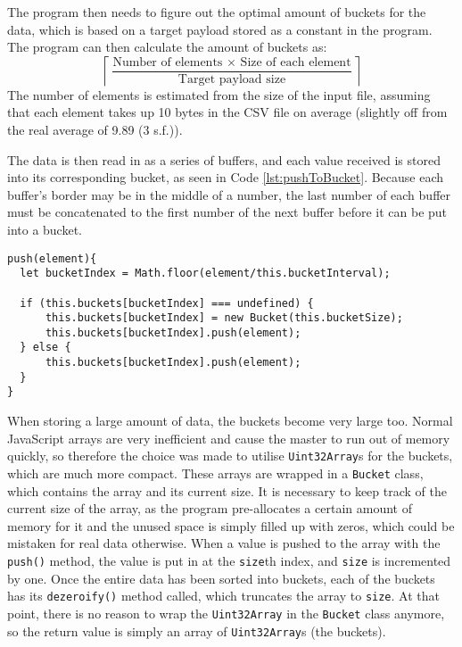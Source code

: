 The program then needs to figure out the optimal amount of buckets for the data, which is based on a target payload stored as a constant in the program. The program can then calculate the amount of buckets as:
\begin{equation*} 
\left \lceil{\frac{\text{Number of elements } \times \text{ Size of each element}}{\text{Target payload size}}}\right \rceil
\end{equation*}
The number of elements is estimated from the size of the input file, assuming that each element takes up 10 bytes in the CSV file on average (slightly off from the real average of 9.89 (3 s.f.)).

The data is then read in as a series of buffers, and each value received is stored into its corresponding bucket, as seen in Code \ref{lst:pushToBucket}. Because each buffer's border may be in the middle of a number, the last number of each buffer must be concatenated to the first number of the next buffer before it can be put into a bucket.

\begin{lstlisting}[caption=The part of the bucket sort code that puts the elements in a bucket., label=lst:pushToBucket] 
push(element){
  let bucketIndex = Math.floor(element/this.bucketInterval);

  if (this.buckets[bucketIndex] === undefined) {
      this.buckets[bucketIndex] = new Bucket(this.bucketSize);
      this.buckets[bucketIndex].push(element);
  } else {
      this.buckets[bucketIndex].push(element);
  }
}
\end{lstlisting}

When storing a large amount of data, the buckets become very large too. Normal JavaScript arrays are very inefficient and cause the master to run out of memory quickly, so therefore the choice was made to utilise \lstinline{Uint32Array}s for the buckets, which are much more compact. These arrays are wrapped in a \lstinline{Bucket} class, which contains the array and its current size. It is necessary to keep track of the current size of the array, as the program pre-allocates a certain amount of memory for it and the unused space is simply filled up with zeros, which could be mistaken for real data otherwise. When a value is pushed to the array with the \lstinline{push()} method, the value is put in at the \lstinline{size}th index, and \lstinline{size} is incremented by one. Once the entire data has been sorted into buckets, each of the buckets has its \lstinline{dezeroify()} method called, which truncates the array to \lstinline{size}. At that point, there is no reason to wrap the \lstinline{Uint32Array} in the \lstinline{Bucket} class anymore, so the return value is simply an array of \lstinline{Uint32Array}s (the buckets).


